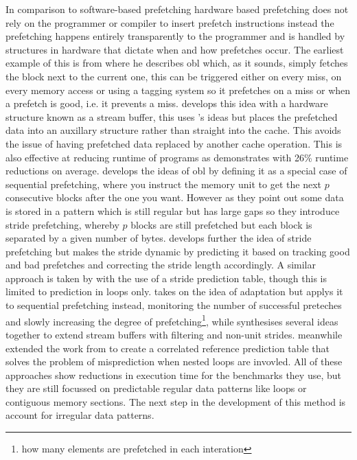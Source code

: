 In comparison to software-based prefetching hardware based prefetching does not rely on the programmer or compiler to insert prefetch instructions instead the prefetching happens entirely transparently to the programmer and is handled by structures in hardware that dictate when and how prefetches occur. The earliest example of this is from \citet{smithCacheMemories1982} where he describes \gls{obl} which, as it sounds, simply fetches the block next to the current one, this can be triggered either on every miss, on every memory access or using a tagging system so it prefetches on a miss or when a prefetch is good, i.e. it prevents a miss. \citet{jouppiImprovingDirectmappedCache1990} develops this idea with a hardware structure known as a stream buffer, this uses \citeauthor{smithCacheMemories1982}'s ideas but places the prefetched data into an auxillary structure rather than straight into the cache. This avoids the issue of having prefetched data replaced by another cache operation. This is also effective at reducing runtime of programs as \citet{farkasHowUsefulAre1995} demonstrates with 26\% runtime reductions on average. \citet{fuDataPrefetchingMultiprocessor1991} develops the ideas of \gls{obl} by defining it as a special case of sequential prefetching, where you instruct the memory unit to get the next $p$ consecutive blocks after the one you want. However as they point out some data is stored in a pattern which is still regular but has large gaps so they introduce stride prefetching, whereby $p$ blocks are still prefetched but each block is separated by a given number of bytes. \citet{baerEffectiveOnchipPreloading1991} develops further the idea of stride prefetching but makes the stride dynamic by predicting it based on tracking good and bad prefetches and correcting the stride length accordingly. A similar approach is taken by \citet{fuStrideDirectedPrefetching1992} with the use of a stride prediction table, though this is limited to prediction in loops only. \citet{dahlgrenFixedAdaptiveSequential1993} takes on the idea of adaptation but applys it to sequential prefetching instead, monitoring the number of successful preteches and slowly increasing the degree of prefetching\footnote{how many elements are prefetched in each interation}, while \citet{palacharlaEvaluatingStreamBuffers1994} synthesises several ideas together to extend stream buffers with filtering and non-unit strides. \citet{chenEffectiveHardwarebasedData1995} meanwhile extended the work from \citeyear{baerEffectiveOnchipPreloading1991}\cite{baerEffectiveOnchipPreloading1991} to create a correlated reference prediction table that solves the problem of misprediction when nested loops are invovled. All of these approaches show reductions in execution time for the benchmarks they use, but they are still focussed on predictable regular data patterns like loops or contiguous memory sections. The next step in the development of this method is account for irregular data patterns.

